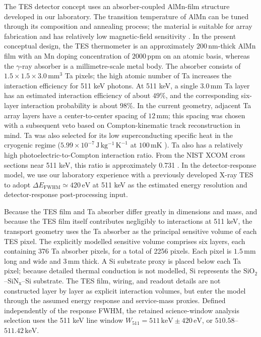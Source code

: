 \documentclass[11pt]{article}
\begin{document}
The TES detector concept uses an absorber-coupled AlMn-film structure developed
in our laboratory. The transition temperature of AlMn can be tuned through its
composition and annealing process; the material is suitable for array fabrication
and has relatively low magnetic-field sensitivity
\cite{Xie2026AlMn,Vavagiakis2017AlMnMagnetic}. In the present conceptual design,
the TES thermometer is an approximately $200\,\mathrm{nm}$-thick AlMn film with
an Mn doping concentration of $2000\,\mathrm{ppm}$ on an atomic basis, whereas the $\gamma$-ray absorber is a
millimetre-scale metal body. The absorber consists of
$1.5\times1.5\times3.0\,\mathrm{mm^3}$ Ta pixels; the high atomic number of Ta
increases the interaction efficiency for 511 keV photons. At 511 keV, a single
$3.0\,\mathrm{mm}$ Ta layer has an estimated interaction efficiency of about
$49\%$, and the corresponding six-layer interaction probability is about
$98\%$. In the
current geometry, adjacent Ta array layers have a center-to-center spacing of
$12\,\mathrm{mm}$; this spacing was chosen with a subsequent veto based on
Compton-kinematic track reconstruction in mind. Ta was also selected for its low
superconducting specific heat in the cryogenic regime
($5.99\times10^{-7}\,\mathrm{J\,kg^{-1}\,K^{-1}}$ at $100\,\mathrm{mK}$
\cite{Yan2019TaHeatCapacity}). Ta also has a relatively
high photoelectric-to-Compton interaction ratio. From
the NIST XCOM cross sections near 511 keV, this ratio is approximately 0.731
\cite{NISTXCOM}. In the detector-response model, we use our laboratory experience
with a previously developed X-ray TES \cite{Xie2026AlMn} to adopt
$\Delta E_{\mathrm{FWHM}}\simeq420\,\mathrm{eV}$ at 511 keV as the estimated
energy resolution and detector-response post-processing input.

Because the TES film and Ta absorber differ greatly in dimensions and mass, and
because the TES film itself contributes negligibly to interactions at 511 keV,
the transport geometry uses the Ta absorber as the principal sensitive volume of
each TES pixel. The explicitly modelled sensitive volume comprises six layers,
each containing 376 Ta absorber pixels, for a total of 2256 pixels. Each pixel is
$1.5\,\mathrm{mm}$ long and wide and $3\,\mathrm{mm}$ thick. A Si substrate proxy
is placed below each Ta pixel; because detailed thermal conduction is not modelled,
Si represents the $\mathrm{SiO_2}$--$\mathrm{SiN_x}$--Si substrate. The TES film,
wiring, and readout details are not constructed layer by layer as explicit
interaction volumes, but enter the model through the assumed energy response and
service-mass proxies. Defined independently of the response FWHM, the retained science-window
analysis selection uses the 511 keV line window
$W_{511}=511\,\mathrm{keV}\pm420\,\mathrm{eV}$, or
$510.58$--$511.42\,\mathrm{keV}$.
\end{document}

